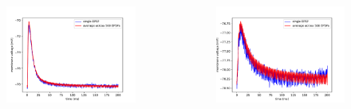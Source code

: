 \documentclass{beamer}
\begin{document}
\begin{frame}
	\begin{columns}
          	\begin{figure}
    				\centering
    				\includegraphics[width=\linewidth]{figures/epsp_out_+.pdf}
 		   \end{figure}


          \begin{figure}
    				\centering
    				\includegraphics[width=\linewidth]{figures/epsp_out_-.pdf}
 		   \end{figure}
          	

	\end{columns}
	
\end{frame}
\end{document}
